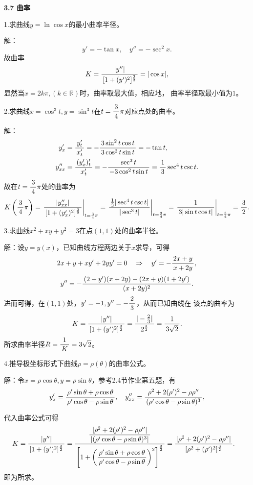 \begin{center}
	\bf 3.7 曲率
\end{center}

1.求曲线$y=\ln\cos x$的最小曲率半径。

解：
$$y'=-\tan x,\quad y''=-\sec^2x.$$
故曲率
$$K=\displaystyle\frac{\,{|y''|}\,}{\,{[1+(y')^2]^{\frac32}}\,}=|\cos x|,$$
显然当$x=2k\pi,(k\in\mathbb{R})$时，曲率取最大值，相应地，
曲率半径取最小值为$1$。
\fin

\bigskip

2.求曲线$x=\cos^3t,y=\sin^3t$在$t=\displaystyle\frac{\,{3}\,}{\,{4}\,}\pi$对应点处的曲率。

解：
\begin{align*}
	y'_x&=\displaystyle\frac{\,{y'_t}\,}{\,{x'_t}\,}=-\displaystyle\frac{\,{3\sin^2t\cos t}\,}{\,{3\cos^2t\sin t}\,}
	=-\tan t,\\
	y''_{xx}&=\displaystyle\frac{\,{(y'_x)'_t}\,}{\,{x'_t}\,}
	=-\displaystyle\frac{\,{\sec^2t}\,}{\,{-3\cos^2t\sin t}\,}=\displaystyle\frac{\,{1}\,}{\,{3}\,}\sec^4t\csc t.
\end{align*}
故在$t=\displaystyle\frac{\,{3}\,}{\,{4}\,}\pi$处的曲率为
$$K\left(\displaystyle\frac{\,{3}\,}{\,{4}\,}\pi\right)=\left.\displaystyle\frac{\,{|y''_{xx}|}\,}{\,{[1+(y'_x)^2]^{\frac32}}\,}\right|_{t=\frac34\pi}
=\left.\displaystyle\frac{\,{\frac13|\sec^4t\csc t|}\,}{\,{|\sec^3t|}\,}\right|_{t=\frac34\pi}
=\left.\displaystyle\frac{\,{1}\,}{\,{3|\sin t\cos t|}\,}\right|_{t=\frac34\pi}
=\displaystyle\frac{\,{3}\,}{\,{2}\,}.$$
\fin

\bigskip

3.求曲线$x^2+xy+y^2=3$在点$(1,1)$处的曲率半径。

解：设$y=y(x)$，已知曲线方程两边关于$x$求导，可得
$$2x+y+xy'+2yy'=0
\quad\Rightarrow\quad
y'=-\displaystyle\frac{\,{2x+y}\,}{\,{x+2y}\,},$$
$$y''=-\displaystyle\frac{\,{(2+y')(x+2y)-(2x+y)(1+2y')}\,}{\,{(x+2y)^2}\,}.$$
进而可得，在$(1,1)$处，$y'=-1,y''=-\displaystyle\frac{\,{2}\,}{\,{3}\,}$，从而已知曲线在
该点的曲率为
$$K=\displaystyle\frac{\,{|y''|}\,}{\,{[1+(y')^2]^{\frac32}}\,}=\displaystyle\frac{\,{|-\frac23|}\,}{\,{2^{\frac32}}\,}
=\displaystyle\frac{\,{1}\,}{\,{3\sqrt2}\,}.$$
所求曲率半径$R=\displaystyle\frac{\,{1}\,}{\,{K}\,}=3\sqrt2$。
\fin

\bigskip

4.推导极坐标形式下曲线$\rho=\rho(\theta)$的曲率公式。

解：令$x=\rho\cos\theta,y=\rho\sin\theta$，参考2.4节作业第五题，有
$$
	y'_x=\displaystyle\frac{\,{\rho'\sin\theta+\rho\cos\theta}\,}{\,{\rho'\cos\theta-\rho\sin\theta}\,},
	\quad
	y''_{xx}=\displaystyle\frac{\,{\rho^2+2(\rho')^2-\rho\rho''}\,}{\,{(\rho'\cos\theta-\rho\sin\theta)^3}\,},
$$

代入曲率公式可得
\begin{align*}
	K&=\displaystyle\frac{\,{|y''|}\,}{\,{[1+(y')^2]^{\frac32}}\,}
	=\displaystyle\frac{\,{\displaystyle\frac{\,{|\rho^2+2(\rho')^2-\rho\rho''|}\,}{\,{|(\rho'\cos\theta-\rho\sin\theta)^3|}\,}}\,}{\,{\left[1+\left(\displaystyle\frac{\,{\rho'\sin\theta+\rho\cos\theta}\,}{\,{\rho'\cos\theta-\rho\sin\theta}\,}
	\right)^2\right]^{\frac32}}\,}
	=\displaystyle\frac{\,{|\rho^2+2(\rho')^2-\rho\rho''|}\,}{\,{[\rho^2+(\rho')^2]^{\frac32}}\,}.
\end{align*}
即为所求。\fin

